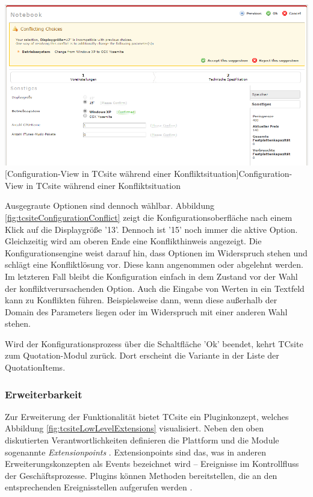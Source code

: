 \documentclass[11pt, a4paper, titlepage, listof=totoc, bibliography=totoc, index=totoc, twoside, openright, headings=normal, draft]{scrreprt}
\begin{document}
\vspace{1em}
\begin{minipage}{\linewidth}
	\centering
	\includegraphics[width=1\linewidth]{Abbildungen/tcsiteConfigurationConflict.PNG}
	[Configuration-View in TCsite während einer Konfliktsituation]{Configuration-View in TCsite während einer Konfliktsituation}
	\label{fig:tcsiteConfigurationConflict}
\end{minipage}
\vspace{0.3em}

Ausgegraute Optionen sind dennoch wählbar. Abbildung \ref{fig:tcsiteConfigurationConflict} zeigt die Konfigurationsoberfläche nach einem Klick auf die Displaygröße '13'. Dennoch ist '15' noch immer die aktive Option. Gleichzeitig wird am oberen Ende eine Konflikthinweis angezeigt. Die Konfigurationsengine weist darauf hin, dass Optionen im Widerspruch stehen und schlägt eine Konfliktlösung vor. Diese kann angenommen oder abgelehnt werden. Im letzteren Fall bleibt die Konfiguration einfach in dem Zustand vor der Wahl der konfliktverursachenden Option. Auch die Eingabe von Werten in ein Textfeld kann zu Konflikten führen. Beispielsweise dann, wenn diese außerhalb der Domain des Parameters liegen oder im Widerspruch mit einer anderen Wahl stehen. 

Wird der Konfigurationsprozess über die Schaltfläche 'Ok' beendet, kehrt TCsite zum Quotation-Modul zurück. Dort erscheint die Variante in der Liste der QuotationItems.

\subsubsection{Erweiterbarkeit}
\label{TCsiteErweiterbarkeit}

Zur Erweiterung der Funktionalität bietet TCsite ein Pluginkonzept, welches Abbildung \ref{fig:tcsiteLowLevelExtensions} visualisiert. Neben den oben diskutierten Verantwortlichkeiten definieren die Plattform und die Module sogenannte \emph{Extensionpoints} \citep{tactonTCsiteApiDocu}. Extensionpoints sind das, was in anderen Erweiterungskonzepten als Events bezeichnet wird -- Ereignisse im Kontrollfluss der Geschäftsprozesse. Plugins können Methoden bereitstellen, die an den entsprechenden Ereignisstellen aufgerufen werden  \citep{tactonTCsiteDevelopmentManual}.
\end{document}
